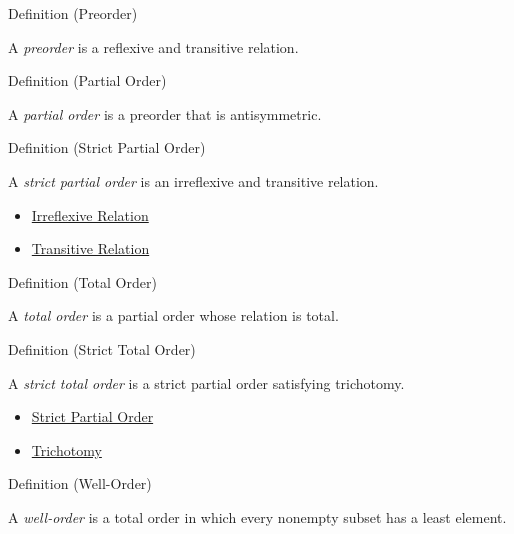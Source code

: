 \begin{definitionbox}{Definition (Preorder)}
\begin{definition*}[Preorder]
A \emph{preorder} is a reflexive and transitive relation.
\end{definition*}
\end{definitionbox}

\begin{definitionbox}{Definition (Partial Order)}
\begin{definition*}
A \emph{partial order} is a preorder that is antisymmetric.
\end{definition*}
\end{definitionbox}

\begin{definitionbox}{Definition (Strict Partial Order)}
\begin{definition}
\label{def:strict-partial-order}
A \emph{strict partial order} is an irreflexive and transitive relation.
\end{definition}
\end{definitionbox}

\begin{dependencies}
\begin{itemize}
  \item \hyperref[def:irreflexive-relation]{Irreflexive Relation}
  \item \hyperref[def:transitive-relation]{Transitive Relation}
\end{itemize}
\end{dependencies}

\begin{definitionbox}{Definition (Total Order)}
\begin{definition*}
A \emph{total order} is a partial order whose relation is total.
\end{definition*}
\end{definitionbox}

\begin{definitionbox}{Definition (Strict Total Order)}
\begin{definition}
\label{def:strict-total-order}
A \emph{strict total order} is a strict partial order satisfying trichotomy.
\end{definition}
\end{definitionbox}

\begin{dependencies}
\begin{itemize}
  \item \hyperref[def:strict-partial-order]{Strict Partial Order}
  \item \hyperref[def:trichotomy]{Trichotomy}
\end{itemize}
\end{dependencies}

\begin{definitionbox}{Definition (Well-Order)}
\begin{definition*}
A \emph{well-order} is a total order in which every nonempty subset has a
least element.
\end{definition*}
\end{definitionbox}
